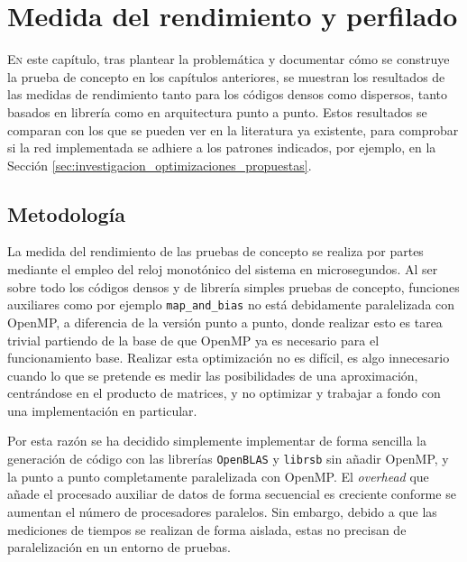 \chapter{Medida del rendimiento y perfilado}
\label{chap:medida_rendimiento_perfilado}

\lettrine{E}{n} este capítulo, tras plantear la problemática y documentar cómo se construye la prueba de concepto en los capítulos anteriores, se muestran los resultados de las medidas de rendimiento tanto para los códigos densos como dispersos, tanto basados en librería como en arquitectura punto a punto. Estos resultados se comparan con los que se pueden ver en la literatura ya existente, para comprobar si la red implementada se adhiere a los patrones indicados, por ejemplo, en la Sección \ref{sec:investigacion_optimizaciones_propuestas}.

\section{Metodología}
\label{sec:metodologia}
La medida del rendimiento de las pruebas de concepto se realiza por partes mediante el empleo del reloj monotónico del sistema en microsegundos. Al ser sobre todo los códigos densos y de librería simples pruebas de concepto, funciones auxiliares como por ejemplo \texttt{map\_and\_bias} no está debidamente paralelizada con OpenMP, a diferencia de la versión punto a punto, donde realizar esto es tarea trivial partiendo de la base de que OpenMP ya es necesario para el funcionamiento base. Realizar esta optimización no es difícil, es algo innecesario cuando lo que se pretende es medir las posibilidades de una aproximación, centrándose en el producto de matrices, y no optimizar y trabajar a fondo con una implementación en particular.

Por esta razón se ha decidido simplemente implementar de forma sencilla la generación de código con las librerías \texttt{OpenBLAS} y \texttt{librsb} sin añadir OpenMP, y la punto a punto completamente paralelizada con OpenMP. El \textit{overhead} que añade el procesado auxiliar de datos de forma secuencial es creciente conforme se aumentan el número de procesadores paralelos. Sin embargo, debido a que las mediciones de tiempos se realizan de forma aislada, estas no precisan de paralelización en un entorno de pruebas.


